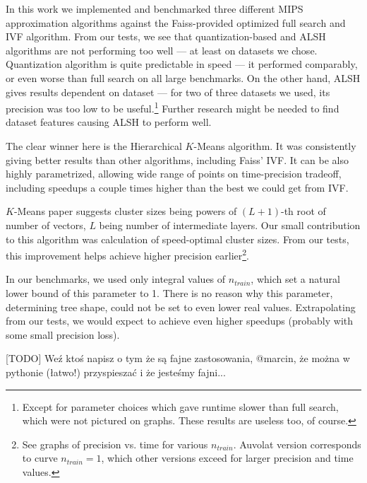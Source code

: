 In this work we implemented and benchmarked three different MIPS 
approximation algorithms
against the Faiss-provided optimized full search and IVF algorithm.
From our tests, we see that quantization-based and ALSH algorithms
are not performing too well --- at least on datasets we chose.
Quantization algorithm is quite predictable in speed --- it performed
comparably, or even worse than full search on all large benchmarks.
On the other hand, ALSH gives results dependent on dataset --- for
two of three datasets we used, its precision was too low to be useful.\footnote{
Except for parameter choices which gave runtime slower than full search,
which were not pictured on graphs. These results are useless too, of course.}
Further research might be needed to find dataset features causing
ALSH to perform well.

The clear winner here is the Hierarchical $K$-Means algorithm. It was consistently
giving better results than other algorithms, including Faiss' IVF. It can be also
highly parametrized, allowing wide range of points on time-precision tradeoff,
including speedups a couple times higher than the best we could get from IVF.

 $K$-Means paper suggests cluster sizes being powers of $(L+1)$-th
root of number of vectors, $L$ being number of intermediate layers. Our
small contribution to this algorithm was calculation of speed-optimal
cluster sizes. From our tests, this improvement helps achieve higher precision
earlier\footnote{
See graphs of precision vs. time for various $n_{train}$. Auvolat version
corresponds to curve $n_{train} = 1$, which other versions exceed for larger
precision and time values.
}. 

In our benchmarks, we used only integral values of $n_{train}$, which set
a natural lower bound of this parameter to 1. There is no reason why this
parameter, determining tree shape, could not be set to even lower real values.
Extrapolating from our tests, we would expect to achieve even higher speedups
(probably with some small precision loss).

[TODO] Weź ktoś napisz o tym że są fajne zastosowania, @marcin, że można w
pythonie (łatwo!) przyspieszać i że jesteśmy fajni... 
